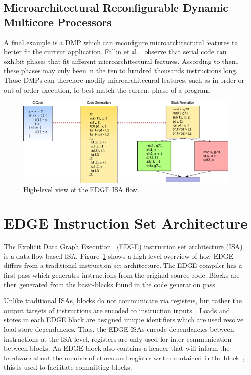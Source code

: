 \subsection{Microarchitectural Reconfigurable Dynamic Multicore Processors}
A final example is a DMP which can reconfigure microarchitectural features to better fit the current application.
Fallin et al.~\cite{fallin} observe that serial code can exhibit phases that fit different microarchitectural features.
According to them, these phases may only been in the ten to hundred thousands instructions long.
These DMPs can therefore modify microarchitecural features, such as in-order or out-of-order execution, to best match the current phase of a program.

\begin{figure}[t]
    \centering
    \includegraphics[width=1\textwidth]{background/graphics/EDGE_3.pdf}
    \caption{High-level view of the EDGE ISA flow.}
    \label{fig:EdgeHigh}
\end{figure}

\section{EDGE Instruction Set Architecture} 
The Explicit Data Graph Execution~\cite{burger04edge} (EDGE) instruction set architecture (ISA) is a data-flow based ISA.
Figure~\ref{fig:EdgeHigh} shows a high-level overview of how EDGE differs from a traditional instruction set architecture.
The EDGE compiler has a first pass which generates instructions from the original source code.
Blocks are then generated from the basic-blocks found in the code generation pass.

Unlike traditional ISAs, blocks do not communicate via registers, but rather the output targets of instructions are encoded to instruction inputs~\cite{smith2006edge}.
Loads and stores in each EDGE block are assigned unique identifiers which are used resolve load-store dependencies.
Thus, the EDGE ISAs encode dependencies between instructions at the ISA level, registers are only used for inter-communication between blocks.
An EDGE block also contains a header that will inform the hardware about the number of stores and register writes contained in the block~\cite{e2paper}, this is used to facilitate committing blocks.

